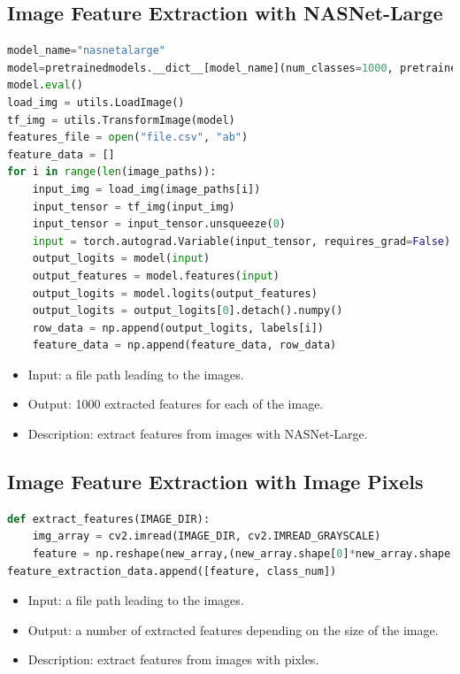 \documentclass[12pt]{article}
\numberwithin{figure}{section} %
\begin{document}
\subsection{Image Feature Extraction with NASNet-Large}
\label{subsection:Image Feature Extraction with NASNet-Large}
\begin{lstlisting}[language = Python]
model_name="nasnetalarge"
model=pretrainedmodels.__dict__[model_name](num_classes=1000, pretrained='imagenet')
model.eval()
load_img = utils.LoadImage()
tf_img = utils.TransformImage(model)
features_file = open("file.csv", "ab")
feature_data = []
for i in range(len(image_paths)):
    input_img = load_img(image_paths[i])
    input_tensor = tf_img(input_img)
    input_tensor = input_tensor.unsqueeze(0)
    input = torch.autograd.Variable(input_tensor, requires_grad=False)
    output_logits = model(input)
    output_features = model.features(input)
    output_logits = model.logits(output_features)
    output_logits = output_logits[0].detach().numpy()
    row_data = np.append(output_logits, labels[i])
    feature_data = np.append(feature_data, row_data)
\end{lstlisting}
\vspace{-1.5em}
\begin{itemize}[leftmargin = 0.5cm, topsep=0pt,itemsep=-1ex,partopsep=1ex,parsep=1ex]
\item Input: a file path leading to the images.
\item Output: 1000 extracted features for each of the image.
\item Description: extract features from images with NASNet-Large. 
\end{itemize}

\subsection{Image Feature Extraction with Image Pixels}
\label{subsection:Image Feature Extraction with Image Pixels}
\begin{lstlisting}[language = Python]
def extract_features(IMAGE_DIR): 
    img_array = cv2.imread(IMAGE_DIR, cv2.IMREAD_GRAYSCALE)
    feature = np.reshape(new_array,(new_array.shape[0]*new_array.shape[1]))
feature_extraction_data.append([feature, class_num])  
\end{lstlisting}
\vspace{-1.5em}
\begin{itemize}[leftmargin = 0.5cm, topsep=0pt,itemsep=-1ex,partopsep=1ex,parsep=1ex]
\item Input: a file path leading to the images.
\item Output: a number of extracted features depending on the size of the image.
\item Description: extract features from images with pixles. 
\end{itemize}
\end{document}
